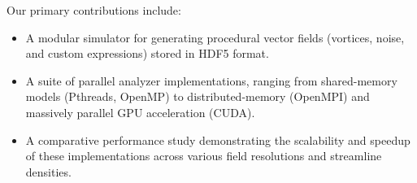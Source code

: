 Our primary contributions include:
\begin{itemize}
	\item A modular simulator for generating procedural vector fields (vortices, noise, and custom expressions) stored in HDF5 format.
	\item A suite of parallel analyzer implementations, ranging from shared-memory models (Pthreads, OpenMP) to distributed-memory (OpenMPI) and massively parallel GPU acceleration (CUDA).
	\item A comparative performance study demonstrating the scalability and speedup of these implementations across various field resolutions and streamline densities.
\end{itemize}
